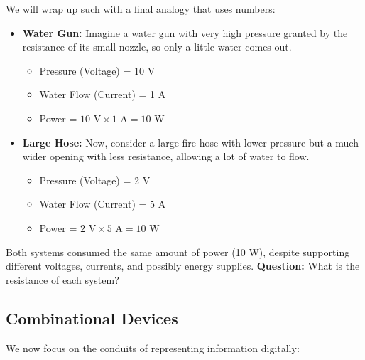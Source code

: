 \noindent
We will wrap up such with a final analogy that uses numbers:
 \begin{Example}

        \begin{itemize}
            \item \textbf{Water Gun:} Imagine a water gun with very high pressure granted by
             the resistance of its small nozzle, so only a little water comes out.
            \begin{itemize}
                \item Pressure (Voltage) = 10 V
                \item Water Flow (Current) = 1 A
                \item Power = $10 \text{ V} \times 1 \text{ A} = 10 \text{ W}$
            \end{itemize}

            \item \textbf{Large Hose:} Now, consider a large fire hose with lower pressure but a much wider opening with 
            less resistance, allowing a lot of water to flow.
            \begin{itemize}
                \item Pressure (Voltage) = 2 V
                \item Water Flow (Current) = 5 A
                \item Power = $2 \text{ V} \times 5 \text{ A} = 10 \text{ W}$
            \end{itemize}
        \end{itemize}
        \noindent
        Both systems consumed the same amount of power (10 W), despite supporting different voltages, currents, and 
        possibly energy supplies. \textbf{Question:} What is the resistance of each system?

    \end{Example}

    \newpage 

    \subsection{Combinational Devices}

    \label{sec:digitally_encoding}

    \noindent
    We now focus on the conduits of representing information digitally:


